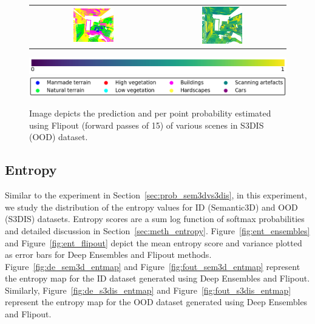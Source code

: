 \begin{figure}[h!]
\begin{tabular}{cc}
            \includegraphics[width=0.33\textwidth, height=0.18\textheight]{images/seg_output/s3dis_DE/office_42.pdf}& 
            \includegraphics[width=0.33\textwidth, height=0.18\textheight]{images/seg_output/s3dis_DE/fout_4.png}\\
        \end{tabular}
        \includegraphics[scale=0.45]{images/prob_legend.pdf}
        \includegraphics[scale=0.45]{images/legend.png}
        \caption{Image depicts the prediction and per point probability estimated using Flipout (forward passes of 15) of various scenes in S3DIS (OOD) dataset.}
        \label{fig:fout_s3dis_probmap}
    \end{figure}


    \FloatBarrier
    \subsection{Entropy}
    \label{sec:ent_sem3dvs3dis}

    Similar to the experiment in Section~\ref{sec:prob_sem3dvs3dis}, in this experiment, we study the distribution of the entropy values for ID (Semantic3D) and OOD (S3DIS) datasets.
    Entropy scores are a sum log function of softmax probabilities and detailed discussion in Section~\ref{sec:meth_entropy}.
    Figure~\ref{fig:ent_ensembles} and Figure~\ref{fig:ent_flipout} depict the mean entropy score and variance plotted as error bars for Deep Ensembles and Flipout methods.    
    Figure~\ref{fig:de_sem3d_entmap} and Figure~\ref{fig:fout_sem3d_entmap} represent the entropy map for the ID dataset generated using Deep Ensembles and Flipout.
    Similarly, Figure~\ref{fig:de_s3dis_entmap} and Figure~\ref{fig:fout_s3dis_entmap} represent the entropy map for the OOD dataset generated using Deep Ensembles and Flipout.

